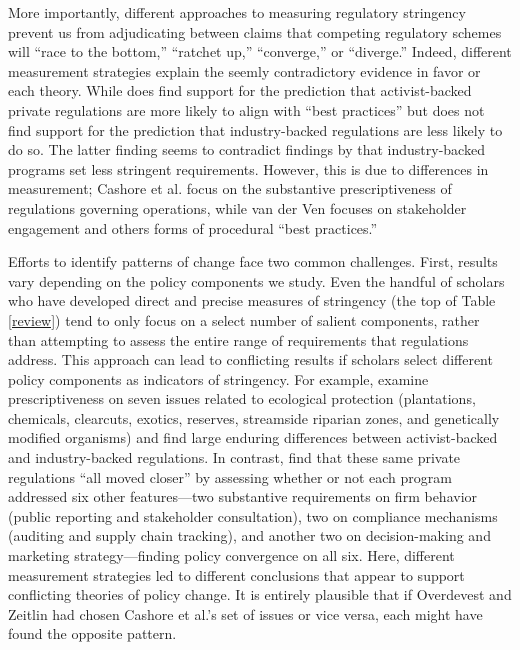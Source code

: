 \documentclass[
      12pt,
            Review ]{article}
\begin{document}
More importantly, different approaches to measuring regulatory
stringency prevent us from adjudicating between claims that competing
regulatory schemes will ``race to the bottom,'' ``ratchet up,''
``converge,'' or ``diverge.'' Indeed, different measurement strategies
explain the seemly contradictory evidence in favor or each theory. While
\citet{VanderVen2015} does find support for the prediction that
activist-backed private regulations are more likely to align with ``best
practices'' but does not find support for the prediction that
industry-backed regulations are less likely to do so. The latter finding
seems to contradict findings by \citet{Cashore2004} that industry-backed
programs set less stringent requirements. However, this is due to
differences in measurement; Cashore et al. focus on the substantive
prescriptiveness of regulations governing operations, while van der Ven
focuses on stakeholder engagement and others forms of procedural ``best
practices.''

Efforts to identify patterns of change face two common challenges.
First, results vary depending on the policy components we study. Even
the handful of scholars who have developed direct and precise measures
of stringency (the top of Table \ref{review}) tend to only focus on a
select number of salient components, rather than attempting to assess
the entire range of requirements that regulations address. This approach
can lead to conflicting results if scholars select different policy
components as indicators of stringency. For example, \citet{Cashore2004}
examine prescriptiveness on seven issues related to ecological
protection (plantations, chemicals, clearcuts, exotics, reserves,
streamside riparian zones, and genetically modified organisms) and find
large enduring differences between activist-backed and industry-backed
regulations. In contrast, \citet{Overdevest2014} find that these same
private regulations ``all moved closer'' by assessing whether or not
each program addressed six other features---two substantive requirements
on firm behavior (public reporting and stakeholder consultation), two on
compliance mechanisms (auditing and supply chain tracking), and another
two on decision-making and marketing strategy---finding policy
convergence on all six. Here, different measurement strategies led to
different conclusions that appear to support conflicting theories of
policy change. It is entirely plausible that if Overdevest and Zeitlin
had chosen Cashore et al.'s set of issues or vice versa, each might have
found the opposite pattern.
\end{document}
